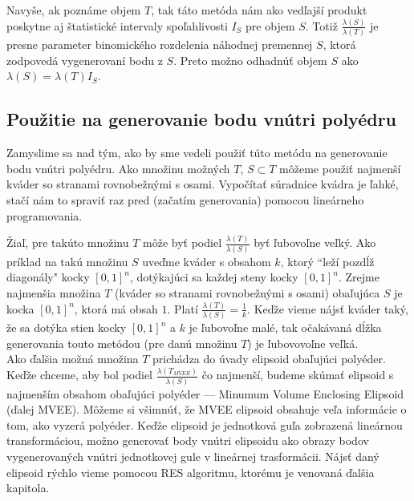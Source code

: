 Navyše, ak poznáme objem $T$, tak táto metóda nám ako vedľajší produkt poskytne aj štatistické intervaly spoľahlivosti $I_S$ pre objem $S$. Totiž $\frac{\lambda(S)}{\lambda(T)}$ je presne parameter binomického rozdelenia náhodnej premennej $S$, ktorá zodpovedá vygenerovaní bodu z $S$. Preto možno odhadnúť objem $S$ ako $\lambda(S)=\lambda(T)I_S$.

\subsection{Použitie na generovanie bodu vnútri polyédru}

Zamyslime sa nad tým, ako by sme vedeli použiť túto metódu na generovanie bodu vnútri polyédru. Ako množinu možných $T$, $S \subset T$ môžeme použiť najmenší kváder so stranami rovnobežnými s osami. Vypočítať súradnice kvádra je ľahké, stačí nám to spraviť raz pred (začatím generovania) pomocou lineárneho programovania.

Žiaľ, pre takúto množinu $T$ môže byť podiel $\frac{\lambda(T)}{\lambda(S)}$ byť ľubovoľne veľký. Ako príklad na takú množinu $S$ uveďme kváder s obsahom $k$, ktorý ``leží pozdĺž diagonály" kocky $[0,1]^n$, dotýkajúci sa každej steny kocky $[0,1]^n$. Zrejme najmenšia množina $T$ (kváder so stranami rovnobežnými s osami) obaľujúca $S$ je kocka $[0,1]^n$, ktorá má obsah $1$. Platí $\frac{\lambda(T)}{\lambda(S)}=\frac{1}{k}$. Keďže vieme nájsť kváder taký, že sa dotýka stien kocky $[0,1]^n$ a $k$ je ľubovoľne malé, tak očakávaná dĺžka generovania touto metódou (pre danú množinu $T$) je ľubovovoľne veľká.\\

Ako ďalšia možná množina $T$ prichádza do úvady elipsoid obaľujúci polyéder. Keďže chceme, aby bol podiel $\frac{\lambda(T_{MVEE})}{\lambda(S)}$ čo najmenší, budeme skúmať elipsoid s najmenším obsahom obaľujúci polyéder --- Minumum Volume Enclosing Elipsoid (ďalej MVEE). Môžeme si všimnúť, že MVEE elipsoid obsahuje veľa informácie o tom, ako vyzerá polyéder. Keďže elipsoid je jednotková guľa zobrazená lineárnou transformáciou, možno generovať body vnútri elipsoidu ako obrazy bodov vygenerovaných vnútri jednotkovej gule v lineárnej trasformácii. Nájsť daný elipsoid rýchlo vieme pomocou RES algoritmu, ktorému je venovaná ďalšia kapitola.

